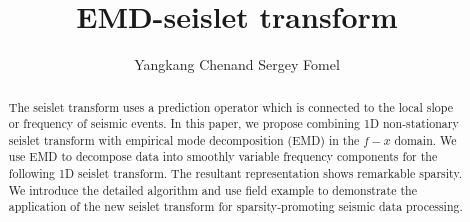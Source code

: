 
\title{EMD-seislet transform}
\renewcommand{\thefootnote}{\fnsymbol{footnote}}
\author{Yangkang Chen\footnotemark[1] and Sergey Fomel\footnotemark[2]}



\address{
\footnotemark[1]Previously: 
John A. and Katherine G. Jackson School of Geosciences \\
The University of Texas at Austin\\
University Station\\
Box X, Austin, TX 78713-8924\\
Currently: 
National Center for Computational Sciences\\
Oak Ridge National Laboratory\\
One Bethel Valley Road\\
Oak Ridge, TN 37831-6008\\
chenyk2016@gmail.com\&cheny@ornl.gov\\
\footnotemark[2]
John A. and Katherine G. Jackson School of Geosciences \\
The University of Texas at Austin\\
University Station\\
Box X, Austin, TX 78713-8924\\
sergey.fomel@beg.utexas.edu 
}

\maketitle

\begin{abstract}
The seislet transform uses a prediction operator which is connected to the local slope or frequency of seismic events. In this paper, we propose combining  1D non-stationary seislet transform with empirical mode decomposition (EMD) in the $f-x$ domain. We use  EMD to decompose data into smoothly variable frequency components for the following 1D seislet transform. The resultant representation shows remarkable sparsity.  We introduce the detailed algorithm and use  field example to demonstrate the application of the new seislet transform for sparsity-promoting seismic data processing.
\end{abstract}


